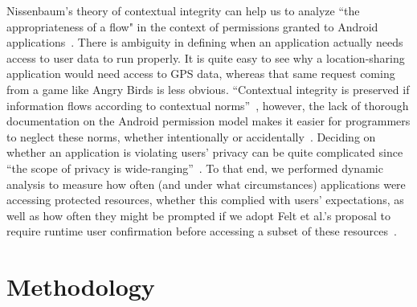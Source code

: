 \documentclass[letterpaper,twocolumn,10pt]{article}
\begin{document}
Nissenbaum's theory of contextual integrity can help us to analyze ``the appropriateness of a flow" in the context of permissions granted to Android applications~\cite{Nissenbaum2004}. There is ambiguity in defining when an application actually needs access to user data to run properly. It is quite easy to see why a location-sharing application would need access to GPS data, whereas that same request coming from a game like Angry Birds is less obvious. ``Contextual integrity is preserved if information flows according to contextual norms''~\cite{Nissenbaum2004}, however, the lack of thorough documentation on the Android permission model makes it easier for programmers to neglect these norms, whether intentionally or accidentally~\cite{Shklovski2014}. Deciding on whether an application is violating users' privacy can be quite complicated since ``the scope of privacy is wide-ranging''~\cite{Nissenbaum2004}. To that end, we performed dynamic analysis to measure how often (and under what circumstances) applications were accessing protected resources, whether this complied with users' expectations, as well as how often they might be prompted if we adopt Felt et al.'s proposal to require runtime user confirmation before accessing a subset of these resources~\cite{Felt2012b}.

\iffalse Stuff on Android / Mobile permissions:
Other mobile permissions stuff to look at:
\cite{Werthmann2013} \cite{Huang2014}
\cite{Balebako2013}
\cite{Livshits2013}
\cite{Hao2014}
\cite{Rosen2013}
\cite{Wang2013b}
\cite{Sellwood2013}

Contextual privacy:
\cite{Nissenbaum2004} --- main paper on this
\cite{Barkhuus2012} --- further discussion
\cite{Barth2006} --- formalizes some of the ideas behind contextual privacy
\cite{Ronen2013} --- applying contextual privacy to single sign-on
\cite{Egelman2013c} --- because people's expectations were more cynical than reality, they were willing to use Facebook Connect
\cite{Bilogrevic2013} --- created a classifier to infer sharing preferences
\cite{Shklovski2014} --- examined people's risk perceptions/privacy expectations when using mobile apps


\fi


\section{Methodology}
\end{document}
